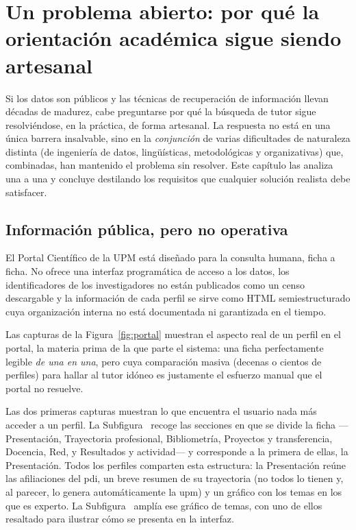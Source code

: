 \chapter[Planteamiento del problema]{Un problema abierto: por qué la orientación académica sigue siendo artesanal}
\label{ch:problema}

Si los datos son públicos y las técnicas de recuperación de información llevan décadas de madurez, cabe preguntarse por qué la búsqueda de tutor sigue resolviéndose, en la práctica, de forma artesanal.
La respuesta no está en una única barrera insalvable, sino en la \emph{conjunción} de varias dificultades de naturaleza distinta (de ingeniería de datos, lingüísticas, metodológicas y organizativas) que, combinadas, han mantenido el problema sin resolver.
Este capítulo las analiza una a una y concluye destilando los requisitos que cualquier solución realista debe satisfacer.

\section{Información pública, pero no operativa}
\label{sec:problema-datos}

El Portal Científico de la UPM está diseñado para la consulta humana, ficha a ficha.
No ofrece una interfaz programática de acceso a los datos, los identificadores de los investigadores no están publicados como un censo descargable y la información de cada perfil se sirve como HTML semiestructurado cuya organización interna no está documentada ni garantizada en el tiempo.

Las capturas de la Figura~\ref{fig:portal} muestran el aspecto real de un perfil en el portal, la materia prima de la que parte el sistema: una ficha perfectamente legible \emph{de una en una}, pero cuya comparación masiva (decenas o cientos de perfiles) para hallar al tutor idóneo es justamente el esfuerzo manual que el portal no resuelve.

Las dos primeras capturas muestran lo que encuentra el usuario nada más acceder a un perfil.
La Subfigura~ recoge las secciones en que se divide la ficha —Presentación, Trayectoria profesional, Bibliometría, Proyectos y transferencia, Docencia, Red, y Resultados y actividad— y corresponde a la primera de ellas, la Presentación.
Todos los perfiles comparten esta estructura: la Presentación reúne las afiliaciones del \gls{pdi}, un breve resumen de su trayectoria (no todos lo tienen y, al parecer, lo genera automáticamente la \gls{upm}) y un gráfico con los temas en los que es experto.
La Subfigura~ amplía ese gráfico de temas, con uno de ellos resaltado para ilustrar cómo se presenta en la interfaz.

